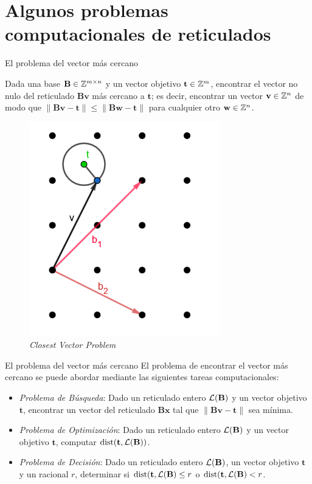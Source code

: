 \section{Algunos problemas computacionales de reticulados}

\begin{frame}{El problema del vector más cercano}
\begin{definition}
Dada una base $\mathbf{B}\in \mathbb{Z}^{m\times n}$ y un vector objetivo $\mathbf{t} \in \mathbb{Z}^m$, encontrar el vector no nulo del reticulado $\mathbf{Bv}$ más cercano a $\mathbf{t}$; es decir, encontrar un vector $\mathbf{v}\in \mathbb{Z}^n$ de modo que $\|\mathbf{Bv}-\mathbf{t}\| \leq \|\mathbf{Bw}-\mathbf{t}\|$ para cualquier otro $\mathbf{w} \in \mathbb{Z}^n$.
\end{definition}
\begin{figure}
    \centering
    \includegraphics[width=0.35\linewidth]{figures/The-closest-vector-problem.png}
    \caption{\textit{Closest Vector Problem}}
    \label{fig:cvp-figure}
\end{figure}

\end{frame}

\begin{frame}{El problema del vector más cercano}
El problema de encontrar el vector más cercano se puede abordar mediante las siguientes tareas computacionales:\\
\vspace{1em}
\begin{itemize}
    \item \textit{Problema de Búsqueda}: Dado un reticulado entero $\mathcal{L}(\mathbf{B})$ y un vector objetivo $\mathbf{t}$, encontrar un vector del reticulado $\mathbf{Bx}$ tal que $\|\mathbf{Bv} - \mathbf{t}\|$ sea mínima.
    \item \textit{Problema de Optimización}: Dado un reticulado entero $\mathcal{L}(\mathbf{B})$ y un vector objetivo $\mathbf{t}$, computar $\text{dist}(\mathbf{t}, \mathcal{L}(\mathbf{B}))$.
    \item \textit{Problema de Decisión}: Dado un reticulado entero $\mathcal{L}(\mathbf{B})$, un vector objetivo $\mathbf{t}$ y un racional $r$, determinar si $\text{dist}(\mathbf{t}, \mathcal{L}(\mathbf{B}) \leq r$ o $\text{dist}(\mathbf{t}, \mathcal{L}(\mathbf{B}) < r$.
\end{itemize}
\end{frame}

